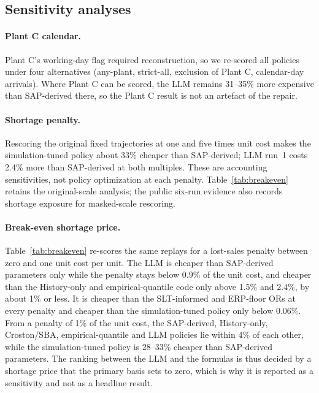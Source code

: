 \documentclass[preprint,12pt,nonatbib]{elsarticle}
\begin{document}
\subsection{Sensitivity analyses}
\label{subsec:sensitivity}
\paragraph{Plant C calendar.} Plant C's working-day flag required reconstruction, so we re-scored all policies under four alternatives (any-plant, strict-all, exclusion of Plant C, calendar-day arrivals). Where Plant C can be scored, the LLM remains 31--35\% more expensive than SAP-derived there, so the Plant C result is not an artefact of the repair.

\paragraph{Shortage penalty.} Rescoring the original fixed trajectories at one and five times unit cost makes the simulation-tuned policy about 33\% cheaper than SAP-derived; LLM run~1 costs 2.4\% more than SAP-derived at both multiples. These are accounting sensitivities, not policy optimization at each penalty. Table~\ref{tab:breakeven} retains the original-scale analysis; the public six-run evidence also records shortage exposure for masked-scale rescoring.

\paragraph{Break-even shortage price.}
Table~\ref{tab:breakeven} re-scores the same replays for a lost-sales penalty between zero and one unit cost per unit. The LLM is cheaper than SAP-derived parameters only while the penalty stays below 0.9\% of the unit cost, and cheaper than the History-only and empirical-quantile code only above 1.5\% and 2.4\%, by about 1\% or less. It is cheaper than the SLT-informed and ERP-floor ORs at every penalty and cheaper than the simulation-tuned policy only below 0.06\%. From a penalty of 1\% of the unit cost, the SAP-derived, History-only, Croston/SBA, empirical-quantile and LLM policies lie within 4\% of each other, while the simulation-tuned policy is 28--33\% cheaper than SAP-derived parameters. The ranking between the LLM and the formulas is thus decided by a shortage price that the primary basis sets to zero, which is why it is reported as a sensitivity and not as a headline result.
\end{document}
